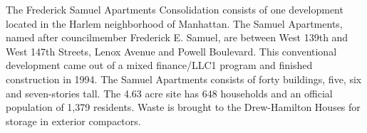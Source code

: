

The Frederick Samuel Apartments Consolidation consists of one development located in the Harlem neighborhood of Manhattan. The Samuel Apartments, named after councilmember Frederick E. Samuel,  are between West 139th and West 147th Streets, Lenox Avenue and Powell Boulevard. This conventional development came out of a mixed finance/LLC1 program and finished construction in 1994. The Samuel Apartments consists of forty buildings, five, six and seven-stories tall. The 4.63 acre site has 648 households and an official population of 1,379 residents. Waste is brought to the Drew-Hamilton Houses for storage in exterior compactors.